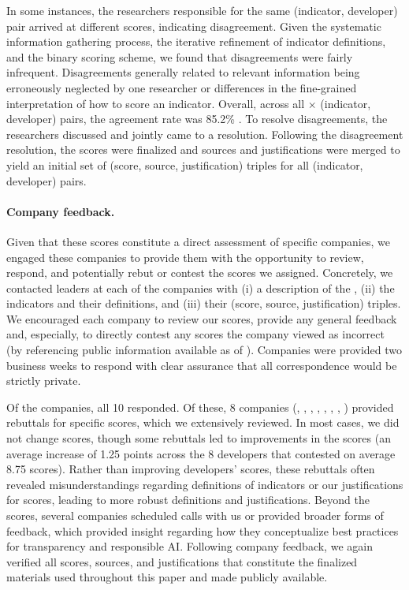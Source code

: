 \documentclass[screen, authorversion, acmsmall]{acmart}
\begin{document}
In some instances, the researchers responsible for the same (indicator, developer) pair arrived at different scores, indicating disagreement. 
Given the systematic information gathering process, the iterative refinement of indicator definitions, and the binary scoring scheme, we found that disagreements were fairly infrequent.
Disagreements generally related to relevant information being erroneously neglected by one researcher or differences in the fine-grained interpretation of how to score an indicator.
Overall, across all \numindicators $\times$ \numcompanies (indicator, developer) pairs, the agreement rate was 85.2\% \citep[Cohen's $\kappa = 0.67$, indicating substantial agreement;][]{landis1977agreement}. 
To resolve disagreements, the researchers discussed and jointly came to a resolution.
Following the disagreement resolution, the scores were finalized and sources and justifications were merged to yield an initial set of \numcells (score, source, justification) triples for all \numcells (indicator, developer) pairs. \clearpage

\paragraph{Company feedback.}
Given that these scores constitute a direct assessment of specific companies, we engaged these companies to provide them with the opportunity to review, respond, and potentially rebut or contest the scores we assigned. 
Concretely, we contacted leaders at each of the companies with (i) a description of the \projectname, 
(ii) the \numindicators indicators and their definitions, and (iii) their \numindicators (score, source, justification) triples. 
We encouraged each company to review our scores, provide any general feedback and, especially, to directly contest any scores the company viewed as incorrect (by referencing public information available as of \informationfreezedate).
Companies were provided two business weeks to respond with clear assurance that all correspondence would be strictly private. 

Of the \numcompanies companies, all 10 responded.
Of these, 8 companies (\amazon, \anthropic, \cohere, \huggingface, \inflection, \meta, \openai, \stability) provided rebuttals for specific scores, which we extensively reviewed. 
In most cases, we did not change scores, though some rebuttals led to improvements in the scores (an average increase of 1.25 points across the 8 developers that contested on average 8.75 scores).
Rather than improving developers' scores, these rebuttals often revealed misunderstandings regarding definitions of indicators or our justifications for scores, leading to more robust definitions and justifications.
Beyond the scores, several companies scheduled calls with us or provided broader forms of feedback, which provided insight regarding how they conceptualize best practices for transparency and responsible AI.
Following company feedback, we again verified all scores, sources, and justifications that constitute the finalized materials used throughout this paper and made publicly available. 
\end{document}
